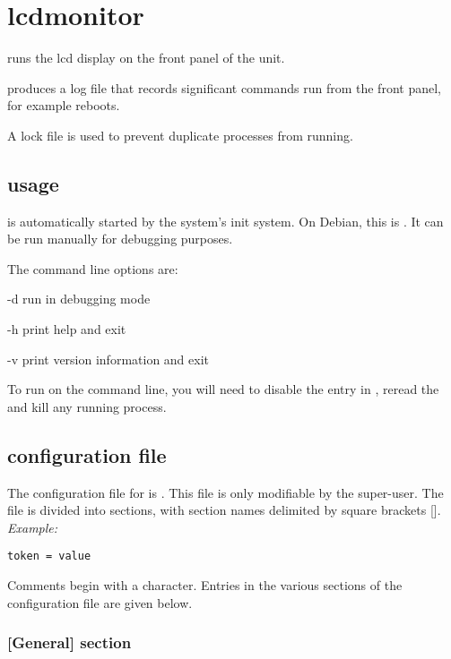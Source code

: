 \section{lcdmonitor \label{slcdmonitor}}

 runs the lcd display on the front panel of the  unit.

 produces a log file  that records 
significant commands run from  the front panel, for example reboots.

A lock file  is used to prevent duplicate processes from running.

\subsection{usage}
 is automatically started by the system's init system.
On Debian, this is . It can be run manually for debugging purposes.

The command line options are:
\begin{description*}
	\item[-d]	run in debugging mode
	\item[-h]	print help and exit
	\item[-v]	print version information and exit
\end{description*}
To run  on the command line, you will need to disable the entry in ,
reread the  and kill any running  process.

\subsection{configuration file}

The configuration file for  is . This file is
only modifiable by the super-user. The file is divided into
sections, with section names delimited by square brackets [\space]. \\
\textit{Example:}
\begin{lstlisting}
token = value
\end{lstlisting}
Comments begin with a \cc{\#} character. Entries in the various sections of the configuration file
are given below. 

\subsubsection{[General] section}

